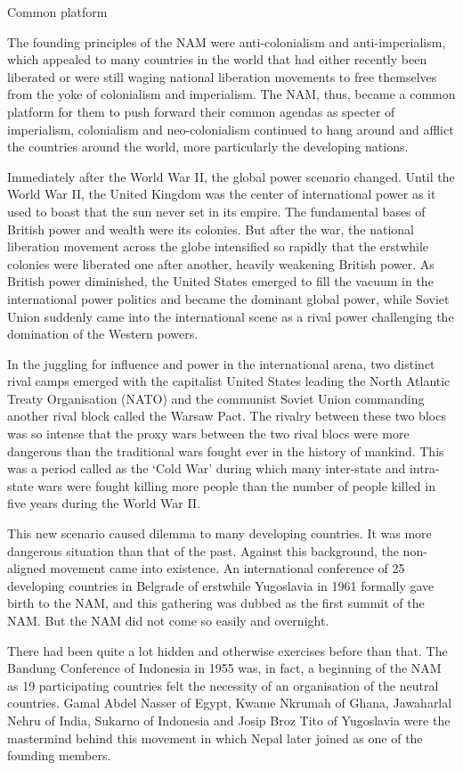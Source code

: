 \documentclass[
  openany]{book}
\begin{document}
Common platform

The founding principles of the NAM were anti-colonialism and anti-imperialism, which appealed to many countries in the world that had either recently been liberated or were still waging national liberation movements to free themselves from the yoke of colonialism and imperialism. The NAM, thus, became a common platform for them to push forward their common agendas as specter of imperialism, colonialism and neo-colonialism continued to hang around and afflict the countries around the world, more particularly the developing nations.

Immediately after the World War II, the global power scenario changed. Until the World War II, the United Kingdom was the center of international power as it used to boast that the sun never set in its empire. The fundamental bases of British power and wealth were its colonies. But after the war, the national liberation movement across the globe intensified so rapidly that the erstwhile colonies were liberated one after another, heavily weakening British power. As British power diminished, the United States emerged to fill the vacuum in the international power politics and became the dominant global power, while Soviet Union suddenly came into the international scene as a rival power challenging the domination of the Western powers.

In the juggling for influence and power in the international arena, two distinct rival camps emerged with the capitalist United States leading the North Atlantic Treaty Organisation (NATO) and the communist Soviet Union commanding another rival block called the Warsaw Pact. The rivalry between these two blocs was so intense that the proxy wars between the two rival blocs were more dangerous than the traditional wars fought ever in the history of mankind. This was a period called as the `Cold War' during which many inter-state and intra-state wars were fought killing more people than the number of people killed in five years during the World War II.

This new scenario caused dilemma to many developing countries. It was more dangerous situation than that of the past. Against this background, the non-aligned movement came into existence. An international conference of 25 developing countries in Belgrade of erstwhile Yugoslavia in 1961 formally gave birth to the NAM, and this gathering was dubbed as the first summit of the NAM. But the NAM did not come so easily and overnight.

There had been quite a lot hidden and otherwise exercises before than that. The Bandung Conference of Indonesia in 1955 was, in fact, a beginning of the NAM as 19 participating countries felt the necessity of an organisation of the neutral countries. Gamal Abdel Nasser of Egypt, Kwame Nkrumah of Ghana, Jawaharlal Nehru of India, Sukarno of Indonesia and Josip Broz Tito of Yugoslavia were the mastermind behind this movement in which Nepal later joined as one of the founding members.
\end{document}
